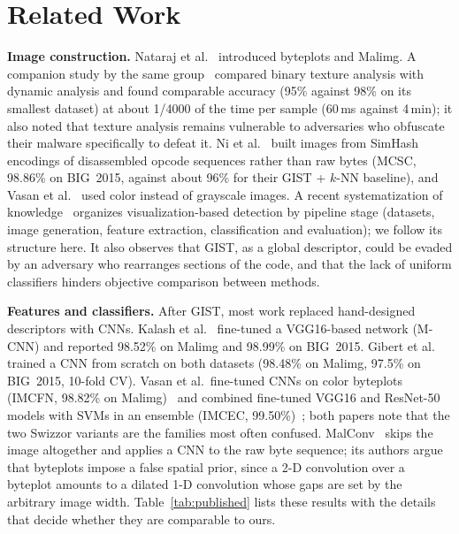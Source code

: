 \documentclass[conference]{IEEEtran}
\begin{document}
\section{Related Work}
\textbf{Image construction.} Nataraj et al.~\cite{nataraj2011images} introduced
byteplots and Malimg. A companion study by the same group~\cite{nataraj2011comparative}
compared binary texture analysis with dynamic analysis and found comparable accuracy
(95\% against 98\% on its smallest dataset) at about 1/4000 of the time per sample
(60\,ms against 4\,min); it also noted that texture analysis remains vulnerable to
adversaries who obfuscate their malware specifically to defeat it. Ni et al.~\cite{ni2018simhash} built
images from SimHash encodings of disassembled opcode sequences rather than raw bytes
(MCSC, 98.86\% on BIG~2015, against about 96\% for their GIST + $k$-NN baseline), and Vasan
et al.~\cite{vasan2020imcfn} used color instead of grayscale images. A recent
systematization of knowledge~\cite{brosolo2024sok} organizes visualization-based
detection by pipeline stage (datasets, image generation, feature extraction,
classification and evaluation); we follow its structure here. It also observes that
GIST, as a global descriptor, could be evaded by an adversary who rearranges sections
of the code, and that the lack of uniform classifiers hinders objective comparison
between methods.

\textbf{Features and classifiers.} After GIST, most work replaced hand-designed
descriptors with CNNs. Kalash et al.~\cite{kalash2018mcnn} fine-tuned a VGG16-based
network (M-CNN) and reported 98.52\% on Malimg and 98.99\% on BIG~2015.
Gibert et al.~\cite{gibert2019cnn} trained a CNN from scratch on both datasets (98.48\% on Malimg,
97.5\% on BIG~2015, 10-fold CV).
Vasan et al.\ fine-tuned CNNs on color byteplots (IMCFN, 98.82\% on
Malimg)~\cite{vasan2020imcfn} and combined fine-tuned VGG16 and ResNet-50 models with
SVMs in an ensemble (IMCEC, 99.50\%)~\cite{vasan2020imcec}; both papers note that the
two Swizzor variants are the families most often confused. MalConv~\cite{raff2018malconv}
skips the image altogether and applies a CNN to the raw byte sequence; its authors argue
that byteplots impose a false spatial prior, since a 2-D convolution over a byteplot
amounts to a dilated 1-D convolution whose gaps are set by the arbitrary image width.
Table~\ref{tab:published}
lists these results with the details that decide whether they are comparable to ours.
\end{document}
